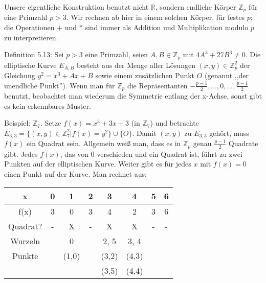 \documentclass[a4paper]{article}
\begin{document}
\begin{multicols}{3}
    Unsere eigentliche Konstruktion benutzt nicht $\mathbb{R}$, sondern endliche Körper $\mathbb{Z}_p$ für eine Primzahl $p>3$. Wir rechnen ab hier in einem solchen Körper, für festes $p$; die Operationen $+$ und $*$ sind immer als Addition und Multiplikation modulo $p$ zu interpretieren.

    Definition 5.13: Sei $p >3$ eine Primzahl, seien $A,B\in\mathbb{Z}_p$ mit $4A^3+ 27B^3 \not= 0$. Die elliptische Kurve $E_{A,B}$ besteht aus der Menge aller Lösungen $(x,y)\in\mathbb{Z}^2_p$ der Gleichung $y^2=x^3+Ax+B$ sowie einem zusätzlichen Punkt $O$ (genannt ,,der unendliche Punkt'').
    Wenn man für $\mathbb{Z}_p$ die Repräsentanten $-\frac{p-1}{2},..., 0 , ...,\frac{p-1}{2}$ benutzt, beobachtet man wiederum die Symmetrie entlang der x-Achse, sonst gibt es kein erkennbares Muster.

    Beispiel: $\mathbb{Z}_7$. Setze $f(x)=x^3+ 3x+ 3$ (in $\mathbb{Z}_7$) und betrachte $E_{3,3}=\{(x,y)\in\mathbb{Z}^2_7 | f(x)=y^2\}\cup \{O\}$. Damit $(x,y)$ zu $E_{3,3}$ gehört, muss $f(x)$ ein Quadrat sein. Allgemein weiß man, dass es in $\mathbb{Z}_p$ genau $\frac{p-1}{2}$ Quadrate gibt. Jedes $f(x)$, das von $0$ verschieden und ein Quadrat ist, führt zu zwei Punkten auf der elliptischen Kurve. Weiter gibt es für jedes $x$ mit $f(x) = 0$ einen Punkt auf der Kurve. Man rechnet aus:

    \begin{tabular}{c|c|c|c|c|c|c|c}
        x        & 0 & 1     & 2 & 3     & 4     & 5 & 6 \\\hline
        f(x)     & 3 & 0     & 3 & 4     & 2     & 3 & 6 \\
        Quadrat? & - & X     & - & X     & X     & - & - \\
        Wurzeln  &   & 0     &   & 2, 5  & 3, 4  &       \\
        Punkte   &   & (1,0) &   & (3,2) & (4,3)         \\
                 &   &       &   & (3,5) & (4,4)
    \end{tabular}


\end{multicols}
\end{document}
